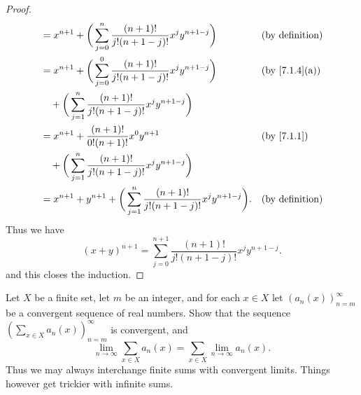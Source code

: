 \begin{proof}
\begin{align*}
     & = x^{n + 1} + \bigg(\sum_{j = 0}^n \dfrac{(n + 1)!}{j!(n + 1 - j)!} x^j y^{n + 1 - j}\bigg)                                   &  & \text{(by definition)}      \\
     & = x^{n + 1} + \bigg(\sum_{j = 0}^0 \dfrac{(n + 1)!}{j!(n + 1 - j)!} x^j y^{n + 1 - j}\bigg)                                   &  & \text{(by \cref{7.1.4}(a))} \\
     & \quad + \bigg(\sum_{j = 1}^n \dfrac{(n + 1)!}{j!(n + 1 - j)!} x^j y^{n + 1 - j}\bigg)                                                                          \\
     & = x^{n + 1} + \dfrac{(n + 1)!}{0! (n + 1)!} x^0 y^{n + 1}                                                                     &  & \text{(by \cref{7.1.1})}    \\
     & \quad + \bigg(\sum_{j = 1}^n \dfrac{(n + 1)!}{j!(n + 1 - j)!} x^j y^{n + 1 - j}\bigg)                                                                          \\
     & = x^{n + 1} + y^{n + 1} + \bigg(\sum_{j = 1}^n \dfrac{(n + 1)!}{j!(n + 1 - j)!} x^j y^{n + 1 - j}\bigg).                      &  & \text{(by definition)}
  \end{align*}
  Thus we have
  \[
    (x + y)^{n + 1} = \sum_{j = 0}^{n + 1} \dfrac{(n + 1)!}{j!(n + 1 - j)!} x^j y^{n + 1 - j}.
  \]
  and this closes the induction.
\end{proof}

\begin{ex}\label{ex:7.1.5}
  Let \(X\) be a finite set, let \(m\) be an integer, and for each \(x \in X\) let \((a_n(x))_{n = m}^\infty\) be a convergent sequence of real numbers.
  Show that the sequence \((\sum_{x \in X} a_n(x))_{n = m}^\infty\) is convergent, and
  \[
    \lim_{n \to \infty} \sum_{x \in X} a_n(x) = \sum_{x \in X} \lim_{n \to \infty} a_n(x).
  \]
  Thus we may always interchange finite sums with convergent limits.
  Things however get trickier with infinite sums.
\end{ex}

